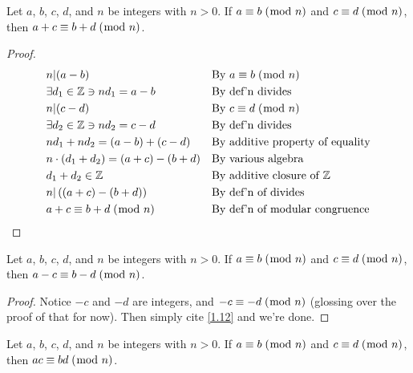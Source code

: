 \documentclass[../main.tex]{subfiles}
\begin{document}
\begin{thm} \label{1.12}
Let $a$, $b$, $c$, $d$, and $n$ be integers with $n > 0$. If $a \equiv b \; (\bmod \; n)$ and $c \equiv d \; (\bmod \; n)$, then $a + c \equiv b + d \; (\bmod \; n)$.
\end{thm}

\begin{proof}
\begin{align}
    &n|(a-b) && \mbox{By $a \equiv b \; (\bmod \; n)$} \\
    &\exists d_1 \in \mathbb{Z} \ni nd_1 = a-b && \mbox{By def'n divides} \\
    &n|(c-d) && \mbox{By $c \equiv d \; (\bmod \; n)$} \\
    &\exists d_2 \in \mathbb{Z} \ni nd_2 = c-d && \mbox{By def'n divides} \\
    &nd_1 + nd_2 = (a - b) + (c - d) && \mbox{By additive property of equality} \\
    &n \cdot (d_1 + d_2) = (a + c) - (b + d) && \mbox{By various algebra} \\
    &d_1 + d_2 \in \mathbb{Z} && \mbox{By additive closure of $\mathbb{Z}$} \\
    &n|\left((a+c)-(b+d)\right) && \mbox{By def'n of divides} \\
    &a+c \equiv b+d \; (\bmod \; n) && \mbox{By def'n of modular congruence} \qedhere
\end{align}
\end{proof}



\pagebreak



\begin{thm} \label{1.13}
Let $a$, $b$, $c$, $d$, and $n$ be integers with $n > 0$. If $a \equiv b \; (\bmod \; n)$ and $c \equiv d \; (\bmod \; n)$, then $a - c \equiv b - d \; (\bmod \; n)$.
\end{thm}

\begin{proof}
Notice $-c$ and $-d$ are integers, and $-c \equiv -d \; (\bmod \; n)$ (glossing over the proof of that for now). Then simply cite \ref{1.12} and we're done.
\end{proof}



\begin{thm} \label{1.14}
Let $a$, $b$, $c$, $d$, and $n$ be integers with $n > 0$. If $a \equiv b \; (\bmod \; n)$ and $c \equiv d \; (\bmod \; n)$, then $ac \equiv bd \; (\bmod \; n)$.
\end{thm}
\end{document}
